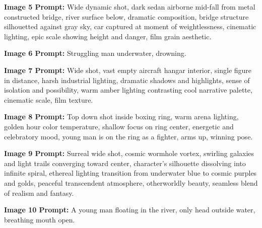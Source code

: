     \textbf{Image 5 Prompt:} Wide dynamic shot, dark sedan airborne mid-fall from metal constructed bridge, river surface below, dramatic composition, bridge structure silhouetted against gray sky, car captured at moment of weightlessness, cinematic lighting, epic scale showing height and danger, film grain aesthetic.

    \textbf{Image 6 Prompt:} Struggling man underwater, drowning.

    \textbf{Image 7 Prompt:} Wide shot, vast empty aircraft hangar interior, single figure in distance, harsh industrial lighting, dramatic shadows and highlights, sense of isolation and possibility, warm amber lighting contrasting cool narrative palette, cinematic scale, film texture.

    \textbf{Image 8 Prompt:} Top down shot inside boxing ring, warm arena lighting, golden hour color temperature, shallow focus on ring center, energetic and celebratory mood, young man is on the ring as a fighter, arms up, winning pose.

    \textbf{Image 9 Prompt:} Surreal wide shot, cosmic wormhole vortex, swirling galaxies and light trails converging toward center, character's silhouette dissolving into infinite spiral, ethereal lighting transition from underwater blue to cosmic purples and golds, peaceful transcendent atmosphere, otherworldly beauty, seamless blend of realism and fantasy.

    \textbf{Image 10 Prompt:} A young man floating in the river, only head outside water, breathing mouth open.